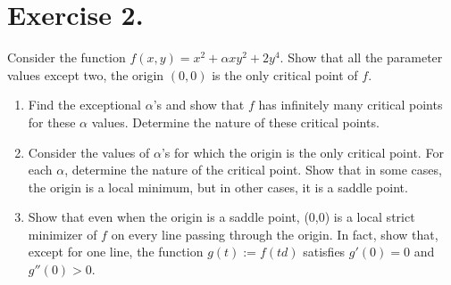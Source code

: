 \section*{Exercise 2.}

Consider the function $f(x,y) = x^2 + \alpha xy^2 + 2 y^4$. Show that all the parameter values except two, the origin $(0,0)$ is the only critical point of $f$.

\begin{enumerate}[label=\alph*]
    \item Find the exceptional $\alpha$'s and show that $f$ has infinitely many critical points for these $\alpha$ values. Determine the nature of these critical points.
    \item Consider the values of $\alpha$'s for which the origin is the only critical point. For each $\alpha$, determine the nature of the critical point. Show that in some cases, the origin is a local minimum, but in other cases, it is a saddle point.
    \item Show that even when the origin is a saddle point, (0,0) is a local strict minimizer of $f$ on every line passing through the origin. In fact, show that, except for one line, the function $g(t) := f(td)$ satisfies $g'(0) = 0$ and $g''(0) > 0$.
\end{enumerate}